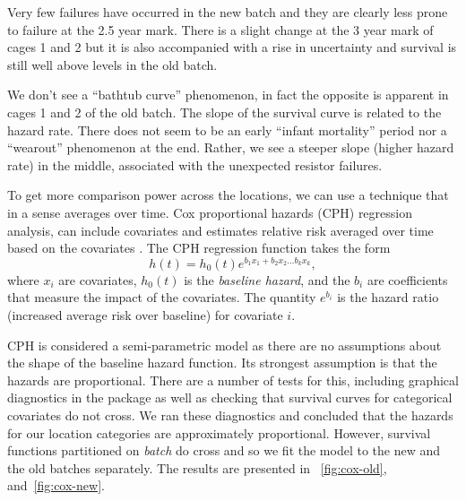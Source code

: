 
Very few failures have occurred in the new batch and they are clearly
less prone to failure at the 2.5 year mark. There is a slight change
at the 3 year mark of cages 1 and 2 but it is also accompanied with a
rise in uncertainty and survival is still well above levels in the old
batch.

We don't see a ``bathtub curve'' phenomenon, in fact the opposite is
apparent in cages 1 and 2 of the old batch. The slope of the survival
curve is related to the hazard rate. There does not seem to be an
early ``infant mortality'' period nor a ``wearout'' phenomenon at the
end. Rather, we see a steeper slope (higher hazard rate) in the
middle, associated with the unexpected resistor failures.

To get more comparison power across the locations, we can use a
technique that in a sense averages over time. Cox proportional hazards
(CPH) regression analysis, can include covariates and estimates
relative risk averaged over time based on the covariates
. The CPH regression function takes
the form
\begin{displaymath}
  h(t) = h_0(t)e^{b_1 x_1 + b_2 x_2 \ldots b_k x_k},
\end{displaymath}
where $x_i$ are covariates, $h_0(t)$ is the {\em baseline hazard}, and
the $b_i$ are coefficients that measure the impact of the
covariates. The quantity $e^{b_i}$ is the hazard ratio (increased
average risk over baseline) for covariate $i$.

CPH is considered a semi-parametric model as there are no assumptions
about the shape of the baseline hazard function. Its strongest
assumption is that the hazards are proportional. There are a number of
tests for this, including graphical diagnostics in the 
package as well as checking that survival curves for categorical
covariates do not cross. We ran these diagnostics and concluded that
the hazards for our location categories are approximately
proportional. However, survival functions partitioned on {\em batch}
do cross and so we fit the model to the new and the old batches
separately. The results are presented in ~\ref{fig:cox-old},
and~\ref{fig:cox-new}.

